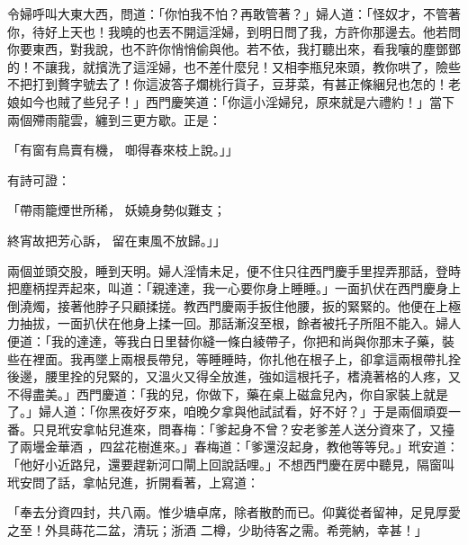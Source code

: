 \begin{showcontents}{}
令婦呼叫大東大西，問道：「你怕我不怕？再敢管著？」婦人道：「怪奴才，不管著你，待好上天也！我曉的也丟不開這淫婦，到明日問了我，方許你那邊去。他若問你要東西，對我說，也不許你悄悄偷與他。若不依，我打聽出來，看我嚷的塵鄧鄧的！不讓我，就擯洗了這淫婦，也不差什麼兒！又相李瓶兒來頭，教你哄了，險些不把打到贅字號去了！你這波答子爛桃行貨子，豆芽菜，有甚正條綑兒也怎的！老娘如今也賊了些兒子！」西門慶笑道：「你這小淫婦兒，原來就是六禮約！」當下兩個殢雨龍雲，纏到三更方歇。正是：

「有窗有鳥賣有機，  啣得春來枝上說。」」

有詩可證：

「帶雨籠煙世所稀，  妖嬈身勢似難支；

終宵故把芳心訴，  留在東風不放歸。」」

兩個並頭交股，睡到天明。婦人淫情未足，便不住只往西門慶手里捏弄那話，登時把塵柄捏弄起來，叫道：「親達達，我一心要你身上睡睡。」一面扒伏在西門慶身上倒澆燭，接著他脖子只顧揉搓。教西門慶兩手扳住他腰，扳的緊緊的。他便在上極力抽拔，一面扒伏在他身上揉一回。那話漸沒至根，餘者被托子所阻不能入。婦人便道：「我的達達，等我白日里替你縫一條白綾帶子，你把和尚與你那末子藥，裝些在裡面。我再墜上兩根長帶兒，等睡睡時，你扎他在根子上，卻拿這兩根帶扎拴後邊，腰里拴的兒緊的，又溫火又得全放進，強如這根托子，榰澆著格的人疼，又不得盡美。」西門慶道：「我的兒，你做下，藥在桌上磁盒兒內，你自家裝上就是了。」婦人道：「你黑夜好歹來，咱晚夕拿與他試試看，好不好？」于是兩個頑耍一番。只見玳安拿帖兒進來，問春梅：「爹起身不曾？安老爹差人送分資來了，又擡了兩壜金華酒 ，四盆花樹進來。」春梅道：「爹還沒起身，教他等等兒。」玳安道：「他好小近路兒，還要趕新河口閘上回說話哩。」不想西門慶在房中聽見，隔窗叫玳安問了話，拿帖兒進，折開看著，上寫道：

「奉去分資四封，共八兩。惟少塘卓席，除者散酌而已。仰冀從者留神，足見厚愛之至！外具蒔花二盆，清玩；浙酒 二樽，少助待客之需。希莞納，幸甚！」


\end{showcontents}
